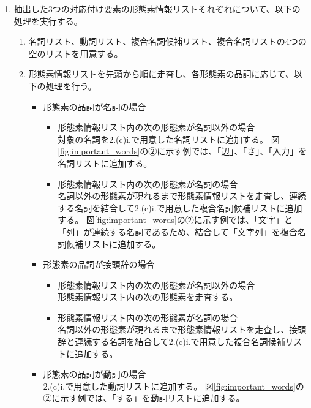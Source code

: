 \begin{enumerate}
\begin{enumerate}
        \item 抽出した$3$つの対応付け要素の形態素情報リストそれぞれについて、以下の処理を実行する。
        \begin{enumerate}
            \item 名詞リスト、動詞リスト、複合名詞候補リスト、複合名詞リストの4つの空のリストを用意する。
            \item 形態素情報リストを先頭から順に走査し、各形態素の品詞に応じて、以下の処理を行う。
            \begin{itemize}
                \item 形態素の品詞が名詞の場合
                    \begin{itemize}
                        \item 形態素情報リスト内の次の形態素が名詞以外の場合\\
                        対象の名詞を$2$.(c)i.で用意した名詞リストに追加する。
                        図\ref{fig:important_words}の②に示す例では、「辺」、「さ」、「入力」を名詞リストに追加する。
                        \item 形態素情報リスト内の次の形態素が名詞の場合\\
                        名詞以外の形態素が現れるまで形態素情報リストを走査し、連続する名詞を結合して$2$.(c)i.で用意した複合名詞候補リストに追加する。
                        図\ref{fig:important_words}の②に示す例では、「文字」と「列」が連続する名詞であるため、結合して「文字列」を複合名詞候補リストに追加する。
                    \end{itemize}
                \item 形態素の品詞が接頭辞の場合
                    \begin{itemize}
                        \item 形態素情報リスト内の次の形態素が名詞以外の場合\\
                        形態素情報リスト内の次の形態素を走査する。
                        \item 形態素情報リスト内の次の形態素が名詞の場合\\
                        名詞以外の形態素が現れるまで形態素情報リストを走査し、接頭辞と連続する名詞を結合して$2$.(c)i.で用意した複合名詞候補リストに追加する。
                    \end{itemize}
                \item 形態素の品詞が動詞の場合\\
                $2$.(c)i.で用意した動詞リストに追加する。
                図\ref{fig:important_words}の②に示す例では、「する」を動詞リストに追加する。

\end{itemize}
\end{enumerate}
\end{enumerate}
\end{enumerate}
